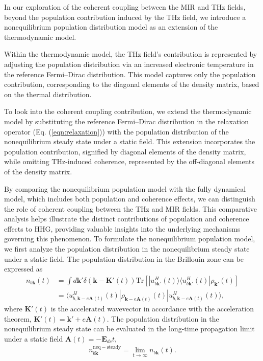 In our exploration of the coherent coupling between the MIR and THz fields, beyond the population contribution induced by the THz field, we introduce a nonequilibrium population distribution model as an extension of the thermodynamic model.

Within the thermodynamic model, the THz field's contribution is represented by adjusting the population distribution via an increased electronic temperature in the reference Fermi--Dirac distribution. This model captures only the population contribution, corresponding to the diagonal elements of the density matrix, based on the thermal distribution.

To look into the coherent coupling contribution, we extend the thermodynamic model by substituting the reference Fermi--Dirac distribution in the relaxation operator (Eq. (\ref{eqn:relaxation})) with the population distribution of the nonequilibrium steady state under a static field. This extension incorporates the population contribution, signified by diagonal elements of the density matrix, while omitting THz-induced coherence, represented by the off-diagonal elements of the density matrix.

By comparing the nonequilibrium population model with the fully dynamical model, which includes both population and coherence effects, we can distinguish the role of coherent coupling between the THz and MIR fields. This comparative analysis helps illustrate the distinct contributions of population and coherence effects to HHG, providing valuable insights into the underlying mechanisms governing this phenomenon.
To formulate the nonequilibrium population model, we first analyze the population distribution in the nonequilibrium steady state under a static field. The population distribution in the Brillouin zone can be expressed as
\begin{align}
	n_{b \mathbf k}(t) & = \int d \mathbf k' \delta(\mathbf k - \mathbf K'(t)) \mathrm{Tr}\left [
	| u^H_{b\mathbf k'}(t)\rangle \langle u^H_{b\mathbf k'}(t)| \rho_{\mathbf k'}(t)
	\right ] \nonumber                                                                                  \\
	                   & =\langle u^H_{b,\mathbf k-e\mathbf A(t)}(t)| \rho_{\mathbf k-e\mathbf A(t)}(t)
	| u^H_{b,\mathbf k-e\mathbf A(t)}(t)\rangle,
\end{align}
where $\mathbf K'(t)$ is the accelerated wavevector in accordance with the acceleration theorem, $\mathbf K'(t)=\mathbf k'+e\mathbf A(t)$. The population distribution in the nonequilibrium steady state can be evaluated in the long-time propagation limit under a static field $\mathbf A(t)= -\mathbf E_{dc}t$,
\begin{align}
	n^{\mathrm{neq-steady}}_{b\mathbf k} = \lim _{t\rightarrow \infty } n_{b \mathbf k}(t).
\end{align}

